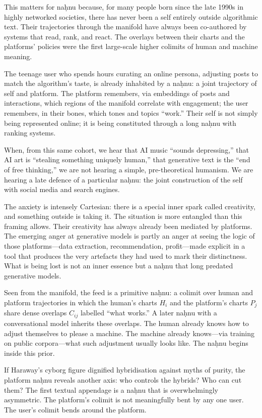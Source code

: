 \documentclass[12pt,a4paper]{article}
\begin{document}
This matters for na\d{h}nu because, for many people born since the late 1990s in highly networked societies, there has never been a self entirely outside algorithmic text. Their trajectories through the manifold have always been co-authored by systems that read, rank, and react. The overlays between their charts and the platforms' policies were the first large-scale higher colimits of human and machine meaning.

The teenage user who spends hours curating an online persona, adjusting posts to match the algorithm's taste, is already inhabited by a na\d{h}nu: a joint trajectory of self and platform. The platform remembers, via embeddings of posts and interactions, which regions of the manifold correlate with engagement; the user remembers, in their bones, which tones and topics ``work.'' Their self is not simply being represented online; it is being constituted through a long na\d{h}nu with ranking systems.

When, from this same cohort, we hear that AI music ``sounds depressing,'' that AI art is ``stealing something uniquely human,'' that generative text is the ``end of free thinking,'' we are not hearing a simple, pre-theoretical humanism. We are hearing a late defence of a particular na\d{h}nu: the joint construction of the self with social media and search engines.

The anxiety is intensely Cartesian: there is a special inner spark called creativity, and something outside is taking it. The situation is more entangled than this framing allows. Their creativity has always already been mediated by platforms. The emerging anger at generative models is partly an anger at seeing the logic of those platforms---data extraction, recommendation, profit---made explicit in a tool that produces the very artefacts they had used to mark their distinctness. What is being lost is not an inner essence but a na\d{h}nu that long predated generative models.

Seen from the manifold, the feed is a primitive na\d{h}nu: a colimit over human and platform trajectories in which the human's charts $H_i$ and the platform's charts $P_j$ share dense overlaps $C_{ij}$ labelled ``what works.'' A later na\d{h}nu with a conversational model inherits these overlaps. The human already knows how to adjust themselves to please a machine. The machine already knows---via training on public corpora---what such adjustment usually looks like. The na\d{h}nu begins inside this prior.

If Haraway's cyborg figure dignified hybridisation against myths of purity, the platform na\d{h}nu reveals another axis: who controls the hybrids? Who can cut them? The first textual appendage is a na\d{h}nu that is overwhelmingly asymmetric. The platform's colimit is not meaningfully bent by any one user. The user's colimit bends around the platform.
\end{document}
